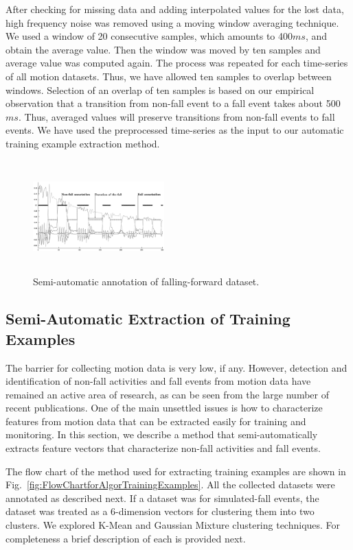 \documentclass[]{IEEEtran}
\begin{document}
After checking for missing data and adding interpolated values for the lost
data,  high frequency noise was removed using a moving window averaging
technique. We used a window  of 20 consecutive samples, which amounts to
400$ms$, and obtain the average value. Then the  window was moved by ten
samples and average  value was computed again. The process was repeated for
each time-series of all motion datasets. Thus, we have allowed ten samples to
overlap between windows.  Selection of an overlap of ten samples is based on
our empirical observation that a transition from non-fall event to a fall event
takes about 500$ms$. Thus, averaged values will preserve transitions from
non-fall events to fall events.   We have used the preprocessed time-series as
the input to our automatic training example extraction method.

\begin{figure}[b]
\centering
\includegraphics[width=0.45\textwidth,height=1.7in]{figures/human_falling_forward2_bw.eps} 
\caption{Semi-automatic annotation of falling-forward dataset.}
 \label{fig:automatic_annotation} 
\end{figure}

\subsection{Semi-Automatic  Extraction of Training Examples}

The barrier for collecting motion data is very low, if any. However, detection
and identification of non-fall activities and fall events from motion data have
remained an active area of research, as can be seen from the large number of
recent publications. One of the main unsettled issues is how to characterize
features from motion data that can be extracted easily for training and
monitoring. In this section, we describe a method that semi-automatically
extracts feature vectors that characterize non-fall activities and fall events.

The flow chart of the method used for extracting training examples are shown in
Fig.~\ref{fig:FlowChartforAlgorTrainingExamples}. All the collected datasets
were annotated as described next. If a dataset was for simulated-fall events,
the dataset was treated as a 6-dimension vectors for clustering them into two
clusters. We explored K-Mean and Gaussian Mixture clustering techniques. For
completeness a brief description of each is provided next.
\end{document}
